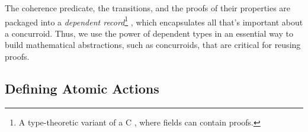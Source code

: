 
The coherence predicate, the transitions, and the proofs of their
properties are packaged into a \emph{dependent record}\footnote{A
  type-theoretic variant of a C , where fields can
  contain proofs.} , which encapsulates all that's
important about a concurroid. Thus, we use the power of dependent
types in an essential way to build mathematical abstractions, such as
concurroids, that are critical for reusing proofs.
%



\subsection{Defining Atomic Actions}
\label{sec:atom-acts}

